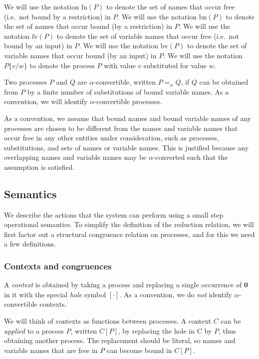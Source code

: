 \documentclass[a4paper]{article}
\newcommand{\Pend}{\bm{0}}
\newcommand{\freenames}[1]{\textrm{fn}(#1)}
\newcommand{\boundnames}[1]{\textrm{bn}(#1)}
\newcommand{\freevars}[1]{\textrm{fv}(#1)}
\newcommand{\boundvars}[1]{\textrm{bv}(#1)}
\newcommand{\alphacon}[2]{#1 =_{\alpha} #2}
\newcommand{\subst}[3]{#1\{#2/#3\}}
\newcommand{\ctxhole}{[\cdot]}
\newcommand{\applyctx}[2]{#1[#2]}
\begin{document}
We will use the notation \( \freenames{P} \) to denote the set of names that occur free (i.e.\ not bound by a restriction) in \( P \).
We will use the notation \( \boundnames{P} \) to denote the set of names that occur bound (by a restriction) in \( P \).
We will use the notation \( \freevars{P} \) to denote the set of variable names that occur free (i.e.\ not bound by an input) in \( P \).
We will use the notation \( \boundvars{P} \) to denote the set of variable names that occur bound (by an input) in \( P \).
We will use the notation \( \subst{P}{v}{w} \) to denote the process \( P \) with value \( v \) substituted for value \( w \).

Two processes \( P \) and \( Q \) are \( \alpha \)-convertible, written \( \alphacon{P}{Q} \), if \( Q \) can be obtained from \( P \) by a finite number of substitutions of bound variable names.
As a convention, we will identify \( \alpha \)-convertible processes.

As a convention, we assume that bound names and bound variable names of any processes are chosen to be different from the names and variable names that occur free in any other entities under consideration, such as processes, substitutions, and sets of names or variable names.
This is justified because any overlapping names and variable names may be \( \alpha \)-converted such that the assumption is satisfied.

\subsection{Semantics}
We describe the actions that the system can perform using a small step operational semantics.
To simplify the definition of the reduction relation, we will first factor out a structural congruence relation on processes, and for this we need a few definitions.

\subsubsection{Contexts and congruences}
A \emph{context} is obtained by taking a process and replacing a single occurrence of \( \Pend \) in it with the special \emph{hole} symbol \( \ctxhole \).
As a convention, we do \emph{not} identify \( \alpha \)-convertible contexts.

We will think of contexts as functions between processes.
A context \( C \) can be \emph{applied} to a process \( P \), written \( \applyctx{C}{P} \), by replacing the hole in C by \( P \), thus obtaining another process.
The replacement should be literal, so names and variable names that are free in \( P \) can become bound in \( \applyctx{C}{P} \).
\end{document}
